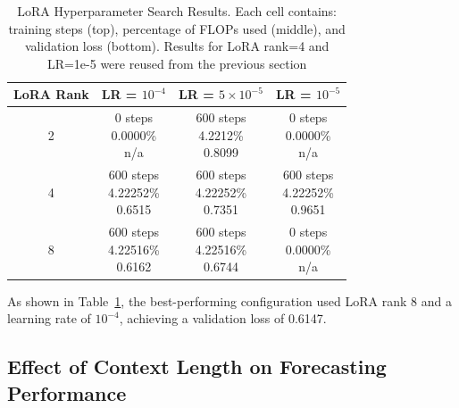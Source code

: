 \documentclass[a4paper,12pt]{article}
\begin{document}
\vspace{0.2cm}

\begin{table}[H]
  \centering
  \begin{tabular}{|c|c|c|c|}
      \hline
      \textbf{LoRA Rank} & \textbf{LR = $10^{-4}$} & \textbf{LR = $5 \times 10^{-5}$} & \textbf{LR = $10^{-5}$} \\
      \hline
      2 & 
      \makecell{0 steps \\ 0.0000\% \\ n/a} & 
      \makecell{600 steps \\ 4.2212\% \\ 0.8099} & 
      \makecell{0 steps \\ 0.0000\% \\ n/a} \\
      \hline
      4 & 
      \makecell{600 steps \\ 4.22252\% \\ 0.6515} & 
      \makecell{600 steps \\ 4.22252\% \\ 0.7351} & 
      \makecell{600 steps \\ 4.22252\% \\ 0.9651} \\
      \hline
      8 & 
      \makecell{600 steps \\ 4.22516\% \\ 0.6162} & 
      \makecell{600 steps \\ 4.22516\% \\ 0.6744} & 
      \makecell{0 steps \\ 0.0000\% \\ n/a} \\
      \hline
  \end{tabular}
  \vspace{0.2cm}
  \caption{LoRA Hyperparameter Search Results. Each cell contains: training steps (top), percentage of FLOPs used (middle), and validation loss (bottom). Results for LoRA rank=4 and LR=1e-5 were reused from the previous section}
  \label{tab:lora_grid_search}
\end{table}

As shown in Table~\ref{tab:lora_grid_search}, the best-performing configuration used LoRA rank 8 and a learning rate of $10^{-4}$, achieving a validation loss of 0.6147.

\subsection*{Effect of Context Length on Forecasting Performance}
\end{document}
